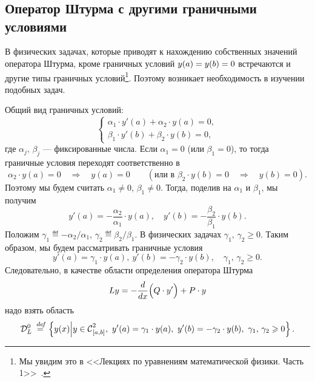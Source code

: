 \chapter{}
\label{lecture7}
\section{Оператор Штурма с другими граничными условиями}
\label{lecture7section1}
В физических задачах, которые приводят к нахождению собственных значений оператора Штурма, кроме граничных условий $y(a)\?=y(b)=0$ встречаются и другие типы граничных условий\footnote[1]{Мы увидим это в <<Лекциях по уравнениям математической физики. Часть 1>>~\cite{mathphys}.}. Поэтому возникает необходимость в изучении подобных задач.

Общий вид граничных условий:
\begin{equation*}
	\begin{cases}
		\alpha_1\cdot y'(a)+\alpha_2\cdot y(a)=0,\\
		\beta_1\cdot y'(b)+\beta_2\cdot y(b)=0,
	\end{cases}
\end{equation*} 
где $\alpha_j,\,\beta_j$ --- фиксированные числа. Если $\alpha_1=0$ (или $\beta_1=0$), то тогда граничные условия переходят соответственно в
\begin{equation*}
	\alpha_2\cdot y(a)=0\quad\Rightarrow\quad y(a)=0\qquad(\text{или в }\beta_2\cdot y(b)=0\quad\Rightarrow\quad y(b)=0).
\end{equation*}  
Поэтому мы будем считать $\alpha_1\neq0$, $\beta_1\neq0$. Тогда{\mb,} поделив на $\alpha_1$ и $\beta_1${\mb,} мы получим
\begin{equation*}
	 y'(a)=-\frac{\alpha_2}{\alpha_1}\cdot y(a),\quad y'(b)=-\frac{\beta_2}{\beta_1}\cdot y(b).
\end{equation*}
Положим $\gamma_1\eqdef-\alpha_2/\alpha_1$, $\gamma_2\eqdef\beta_2/\beta_1$. В физических задачах $\gamma_1,\,\gamma_2\geqslant0$. Таким образом{\mb,} мы будем рассматривать граничные условия 
\begin{equation}
	\label{l7:eq:1}
	 y'(a)=\gamma_1\cdot y(a),\  y'(b)=-\gamma_2\cdot y(b),\quad\gamma_1,\,\gamma_2\geqslant0.
\end{equation} 
Следовательно{\mb,} в качестве области определения оператора Штурма 
\begin{equation*}
	 Ly=-\frac{d}{dx}\Big(Q\cdot y'\Big)+P\cdot y
\end{equation*}
надо взять область
\begin{equation*}
	\mc{D}_{L}^0\eqdef\left\{y(x)\middle|y\in\Cfn[{[a,b]}]{2},\ y'(a)=\gamma_1\cdot y(a),\ y'(b)=-\gamma_2\cdot y(b),\ \gamma_1,\,\gamma_2\geqslant0\right\}.
\end{equation*}

